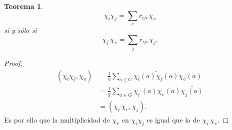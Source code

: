 \documentclass[12pt]{book}
\newtheorem{theorem}{Teorema}[section]
\theoremstyle{definition}
\newcounter{in}
\begin{document}
\begin{theorem}
  \label{t6_2}
\begin{equation*}
  \chi_{i} \chi_{j} = \sum_{\upsilon} r_{ij \upsilon} \chi_{\upsilon}
\end{equation*}
si y sólo si
\begin{equation*}
  \chi_{i^{'}}\chi_{\upsilon} =  \sum_{j} r_{ij \upsilon} \chi_{j}.
\end{equation*}
\end{theorem}
\begin{proof}
  \begin{equation}
    \label{eq:5}
    \begin{aligned}
      (\chi_{i} \chi_{j}, \chi_{\upsilon}) &= \frac{1}{g} \sum_{a \in G} \overline{\chi_{i}(a) \chi_{j}(a)} \chi_{\upsilon}(a) \\
      & = \frac{1}{g} \sum_{a \in G} \chi_{i^{'}}(a) \chi_{\upsilon}(a) \overline{\chi_{j}(a)} \\
      & = (\chi_{i^{'}} \chi_{\upsilon},\chi_{j}).
    \end{aligned}
  \end{equation}
  Es por ello que la multiplicidad de $\chi_{\upsilon}$ en
  $\chi_{i} \chi_{j}$ es igual que la de
  $\chi_{i^{'}} \chi_{\upsilon}$.  
\end{proof}
\end{document}

